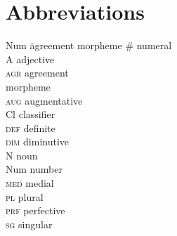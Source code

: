 \documentclass[output=paper
,modfonts
,nonflat]{langsci/langscibook}
\begin{document}
\section*{Abbreviations}
\begin{multicols}{3}
	\begin{tabbing}
		Num\hspace{.5em} \= agreement morpheme\kill
        \# \> numeral \\
		A \> adjective \\
		\textsc{agr} \> agreement \\ \> morpheme \\
		\textsc{aug} \> augmentative \\
		Cl \> classifier \\
		\textsc{def} \> definite \\
		\textsc{dim} \> diminutive \\
		N \> noun \\
		Num \> number \\
		\textsc{med} \> medial \\
		\textsc{pl} \> plural \\
		\textsc{prf} \> perfective \\
		\textsc{sg} \> singular \\
	\end{tabbing}
\end{multicols}

{\sloppy\printbibliography[heading=subbibliography,notkeyword=this]}
\end{document}
